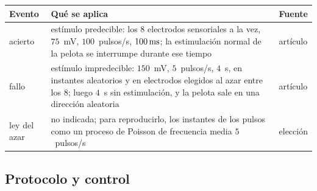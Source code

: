 \begin{center}
\footnotesize
\setlength{\tabcolsep}{4pt}
\renewcommand{\arraystretch}{1.15}
\begin{tabular}{>{\raggedright}p{2.6cm}>{\raggedright}p{8.3cm}>{\raggedright\arraybackslash}p{1.6cm}}
\toprule
Evento & Qué se aplica & Fuente \\
\midrule
acierto & estímulo predecible: los $8$ electrodos sensoriales a la vez, $75$~mV, $100$~pulsos/s, $100\,\text{ms}$; la estimulación normal de la pelota se interrumpe durante ese tiempo & artículo \\
fallo & estímulo impredecible: $150$~mV, $5$~pulsos/s, $4$~s, en instantes aleatorios y en electrodos elegidos al azar entre los $8$; luego $4$~s sin estimulación, y la pelota sale en una dirección aleatoria & artículo \\
ley del azar & no indicada; para reproducirlo, los instantes de los pulsos como un proceso de Poisson de frecuencia media $5$~pulsos/s & elección \\
\bottomrule
\end{tabular}
\end{center}

\subsection*{Protocolo y control}

